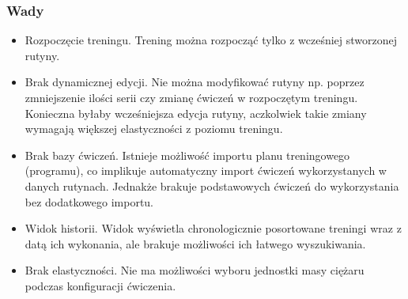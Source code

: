 \documentclass{article}
\begin{document}
            \subsubsection*{Wady}
                  \begin{itemize}
                        \item Rozpoczęcie treningu. Trening można rozpocząć tylko z wcześniej stworzonej rutyny. 
                        \item Brak dynamicznej edycji. Nie można modyfikować rutyny np. poprzez zmniejszenie ilości serii czy zmianę ćwiczeń w rozpoczętym treningu. Konieczna byłaby wcześniejsza edycja rutyny, aczkolwiek takie zmiany wymagają większej elastyczności z poziomu treningu.
                        \item Brak bazy ćwiczeń. Istnieje możliwość importu planu treningowego (programu), co implikuje automatyczny import ćwiczeń wykorzystanych w danych rutynach. Jednakże brakuje podstawowych ćwiczeń do wykorzystania bez dodatkowego importu.
                        \item Widok historii. Widok wyświetla chronologicznie posortowane treningi wraz z datą ich wykonania, ale brakuje możliwości ich łatwego wyszukiwania.
                        \item Brak elastyczności. Nie ma możliwości wyboru jednostki masy ciężaru podczas konfiguracji ćwiczenia.
                  \end{itemize}
\end{document}
